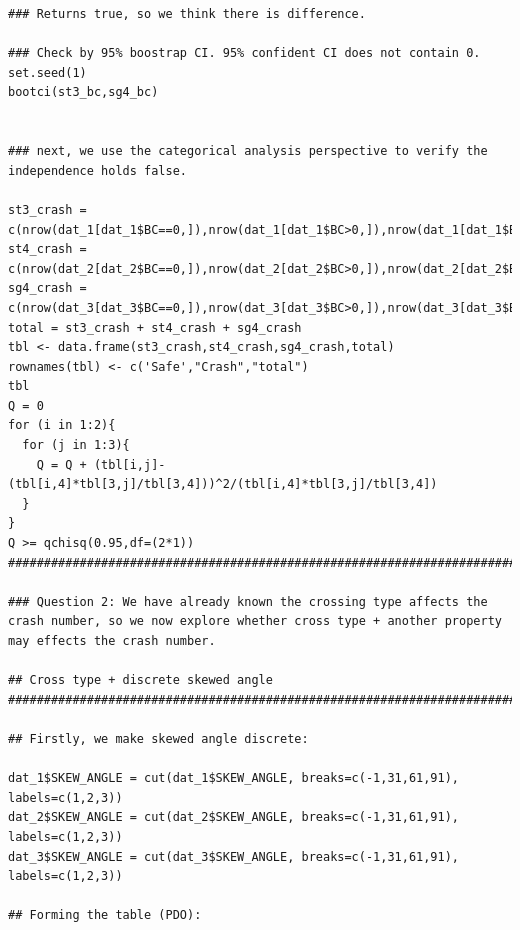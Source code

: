 \documentclass[11pt]{scrartcl} %
\begin{document}
\begin{lstlisting}
### Returns true, so we think there is difference.

### Check by 95% boostrap CI. 95% confident CI does not contain 0.
set.seed(1)
bootci(st3_bc,sg4_bc)


### next, we use the categorical analysis perspective to verify the independence holds false.

st3_crash = c(nrow(dat_1[dat_1$BC==0,]),nrow(dat_1[dat_1$BC>0,]),nrow(dat_1[dat_1$BC==0,])+nrow(dat_1[dat_1$BC>0,]))
st4_crash = c(nrow(dat_2[dat_2$BC==0,]),nrow(dat_2[dat_2$BC>0,]),nrow(dat_2[dat_2$BC==0,])+nrow(dat_2[dat_2$BC>0,]))
sg4_crash = c(nrow(dat_3[dat_3$BC==0,]),nrow(dat_3[dat_3$BC>0,]),nrow(dat_3[dat_3$BC==0,])+nrow(dat_3[dat_3$BC>0,]))
total = st3_crash + st4_crash + sg4_crash
tbl <- data.frame(st3_crash,st4_crash,sg4_crash,total)
rownames(tbl) <- c('Safe',"Crash","total")
tbl
Q = 0
for (i in 1:2){
  for (j in 1:3){
    Q = Q + (tbl[i,j]-(tbl[i,4]*tbl[3,j]/tbl[3,4]))^2/(tbl[i,4]*tbl[3,j]/tbl[3,4])
  }
}
Q >= qchisq(0.95,df=(2*1))
###########################################################################################################################################################################################

### Question 2: We have already known the crossing type affects the crash number, so we now explore whether cross type + another property may effects the crash number.

## Cross type + discrete skewed angle
############################################################################################################################################################################################################

## Firstly, we make skewed angle discrete:

dat_1$SKEW_ANGLE = cut(dat_1$SKEW_ANGLE, breaks=c(-1,31,61,91), labels=c(1,2,3))
dat_2$SKEW_ANGLE = cut(dat_2$SKEW_ANGLE, breaks=c(-1,31,61,91), labels=c(1,2,3))
dat_3$SKEW_ANGLE = cut(dat_3$SKEW_ANGLE, breaks=c(-1,31,61,91), labels=c(1,2,3))

## Forming the table (PDO):


\end{lstlisting}
\end{document}
